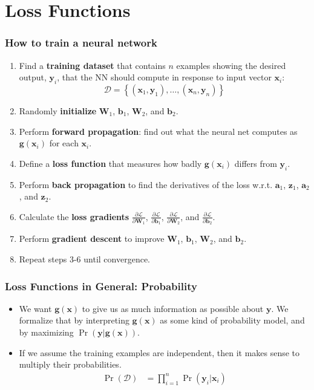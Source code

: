 \documentclass{beamer}
\begin{document}
\section[Loss]{Loss Functions}
\setcounter{subsection}{1}

\begin{frame}
  \frametitle{How to train a neural network}
  \begin{enumerate}
  \item Find a {\bf training dataset} that contains $n$ examples showing the
    desired output, $\mathbf{y}_i$, that the NN should compute in
    response to input vector $\mathbf{x}_i$:
    \[
      {\mathcal D}=\left\{(\mathbf{x}_1,\mathbf{y}_1),\ldots,(\mathbf{x}_n,\mathbf{y}_n)\right\}
    \]
    \item Randomly {\bf initialize} $\mathbf{W}_{1}$,
      $\mathbf{b}_{1}$, $\mathbf{W}_{2}$, and $\mathbf{b}_{2}$.
    \item Perform {\bf forward propagation}: find out what the neural
      net computes as $\mathbf{g}(\mathbf{x}_i)$ for each $\mathbf{x}_i$.
    \item Define a {\bf loss function} that measures
      how badly $\mathbf{g}(\mathbf{x}_i)$ differs from $\mathbf{y}_i$.
    \item Perform {\bf back propagation} to find the derivatives of the loss w.r.t.  $\mathbf{a}_{1}$,
      $\mathbf{z}_{1}$, $\mathbf{a}_{2}$, and $\mathbf{z}_{2}$.
    \item Calculate the {\bf loss gradients}
      $\frac{\partial\mathcal{L}}{\partial\mathbf{W}_{1}}$,
      $\frac{\partial\mathcal{L}}{\partial\mathbf{b}_{1}}$,
      $\frac{\partial\mathcal{L}}{\partial\mathbf{W}_{2}}$, and
      $\frac{\partial\mathcal{L}}{\partial\mathbf{b}_{2}}$.
    \item Perform {\bf gradient descent} to improve  $\mathbf{W}_{1}$,
      $\mathbf{b}_{1}$, $\mathbf{W}_{2}$, and $\mathbf{b}_{2}$.
    \item Repeat steps 3-6 until convergence.
  \end{enumerate}
\end{frame}

\begin{frame}
  \frametitle{Loss Functions in General: Probability}

  \begin{itemize}
  \item 
    We want $\mathbf{g}(\mathbf{x})$ to give us as much information as
    possible about $\mathbf{y}$.  We formalize that by interpreting
    $\mathbf{g}(\mathbf{x})$ as some kind of probability model, and by
    maximizing $\Pr(\mathbf{y}|\mathbf{g}(\mathbf{x}))$.
  \item
    If we assume the training examples are independent, then it
    makes sense to multiply their probabilities. 
    \begin{align*}
      \Pr\left(\mathcal{D}\right) &= \prod_{i=1}^n \Pr\left(\mathbf{y}_i|\mathbf{x}_i\right)
    \end{align*}
  \end{itemize}
\end{frame}
\end{document}
